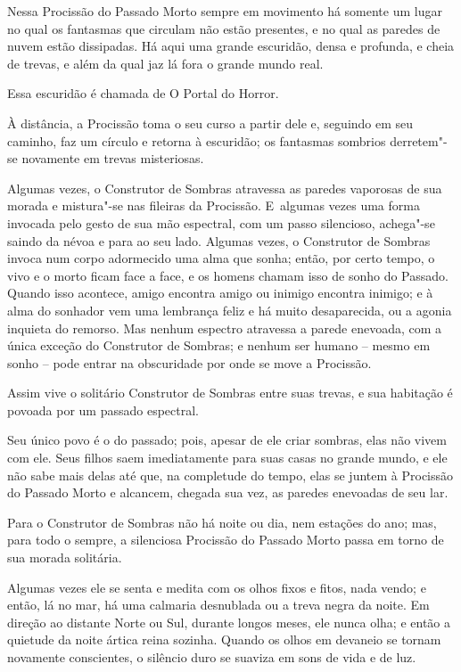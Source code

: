 Nessa Procissão do Passado Morto sempre em movimento há somente um lugar
no qual os fantasmas que circulam não estão presentes, e no qual as
paredes de nuvem estão dissipadas. Há aqui uma grande escuridão, densa e
profunda, e cheia de trevas, e além da qual jaz lá fora o grande mundo
real.

Essa escuridão é chamada de O Portal do Horror.

À distância, a Procissão toma o seu curso a partir dele e, seguindo em
seu caminho, faz um círculo e retorna à escuridão; os fantasmas sombrios
derretem"-se novamente em trevas misteriosas.

Algumas vezes, o Construtor de Sombras atravessa as paredes vaporosas de
sua morada e mistura"-se nas fileiras da Procissão. E~algumas vezes uma
forma invocada pelo gesto de sua mão espectral, com um passo silencioso,
achega"-se saindo da névoa e para ao seu lado. Algumas vezes, o
Construtor de Sombras invoca num corpo adormecido uma alma que sonha;
então, por certo tempo, o vivo e o morto ficam face a face, e os homens
chamam isso de sonho do Passado. Quando isso acontece, amigo encontra
amigo ou inimigo encontra inimigo; e à alma do sonhador vem uma
lembrança feliz e há muito desaparecida, ou a agonia inquieta do
remorso. Mas nenhum espectro atravessa a parede enevoada, com a única
exceção do Construtor de Sombras; e nenhum ser humano -- mesmo em sonho
-- pode entrar na obscuridade por onde se move a Procissão.

Assim vive o solitário Construtor de Sombras entre suas trevas, e sua
habitação é povoada por um passado espectral.

Seu único povo é o do passado; pois, apesar de ele criar sombras, elas
não vivem com ele. Seus filhos saem imediatamente para suas casas no
grande mundo, e ele não sabe mais delas até que, na completude do tempo,
elas se juntem à Procissão do Passado Morto e alcancem, chegada sua vez,
as paredes enevoadas de seu lar.



Para o Construtor de Sombras não há noite ou dia, nem estações do ano;
mas, para todo o sempre, a silenciosa Procissão do Passado Morto passa
em torno de sua morada solitária.

Algumas vezes ele se senta e medita com os olhos fixos e fitos, nada
vendo; e então, lá no mar, há uma calmaria desnublada ou a treva negra
da noite. Em direção ao distante Norte ou Sul, durante longos meses, ele
nunca olha; e então a quietude da noite ártica reina sozinha. Quando os
olhos em devaneio se tornam novamente conscientes, o silêncio duro se
suaviza em sons de vida e de luz.

